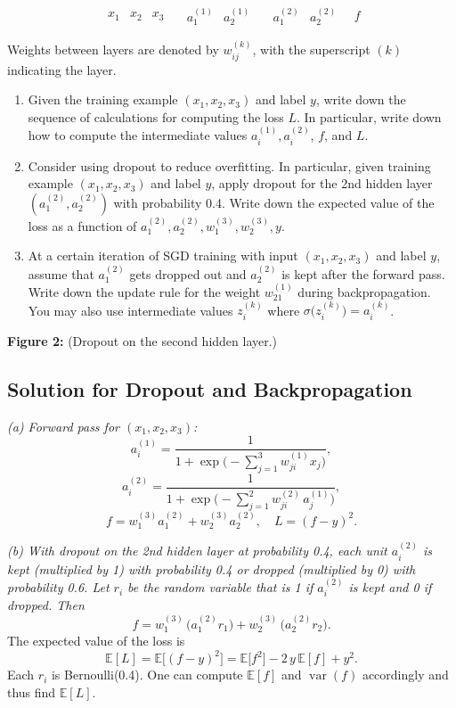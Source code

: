 \documentclass[twocolumn]{article}
\begin{document}
\begin{spacing}{1}
\[
\begin{array}{ccc}
x_1 & x_2 & x_3
\end{array}
\quad
\begin{array}{cc}
a_1^{(1)} & a_2^{(1)}
\end{array}
\quad
\begin{array}{cc}
a_1^{(2)} & a_2^{(2)}
\end{array}
\quad
f
\]

Weights between layers are denoted by $w_{ij}^{(k)}$, with the superscript $(k)$ indicating the layer.

\begin{enumerate}
\item Given the training example $(x_1,x_2,x_3)$ and label $y$, write down the sequence of calculations
for computing the loss $L$. In particular, write down how to compute the intermediate values 
$a_i^{(1)}, a_i^{(2)}$, $f$, and $L$.

\item Consider using dropout to reduce overfitting. In particular, given training example $(x_1,x_2,x_3)$
and label $y$, apply dropout for the 2nd hidden layer $(a_1^{(2)}, a_2^{(2)})$ with probability 0.4. 
Write down the expected value of the loss as a function of $a_1^{(2)}, a_2^{(2)}, w_1^{(3)}, w_2^{(3)}, y$.

\item At a certain iteration of SGD training with input $(x_1,x_2,x_3)$ and label $y$, assume that 
$a_1^{(2)}$ gets dropped out and $a_2^{(2)}$ is kept after the forward pass. Write down the update rule
for the weight $w_{21}^{(1)}$ during backpropagation. You may also use intermediate values 
$z_i^{(k)}$ where $\sigma\bigl(z_i^{(k)}\bigr) = a_i^{(k)}$.
\end{enumerate}

\bigskip
\noindent
\textbf{Figure 2:} (Dropout on the second hidden layer.)

\subsection*{Solution for Dropout and Backpropagation}

\noindent
\emph{(a) Forward pass for $(x_1,x_2,x_3)$:}
\[
a_i^{(1)} = \frac{1}{1+\exp\bigl(-\sum_{j=1}^3 w_{ji}^{(1)} x_j\bigr)}, 
\]
\[
a_i^{(2)} = \frac{1}{1+\exp\bigl(-\sum_{j=1}^2 w_{ji}^{(2)}\,a_j^{(1)}\bigr)},
\]
\[
f = w_{1}^{(3)} a_1^{(2)} + w_{2}^{(3)} a_2^{(2)},
\quad
L = (f - y)^2.
\]

\noindent
\emph{(b) With dropout on the 2nd hidden layer at probability 0.4, each unit $a_i^{(2)}$ is kept (multiplied by 1)
with probability 0.4 or dropped (multiplied by 0) with probability 0.6. Let $r_i$ be the random variable 
that is 1 if $a_i^{(2)}$ is kept and 0 if dropped. Then}
\[
f = w_{1}^{(3)}\,\bigl(a_1^{(2)} r_1\bigr) + w_{2}^{(3)}\,\bigl(a_2^{(2)} r_2\bigr).
\]
The expected value of the loss is
\[
\mathbb{E}[L] = \mathbb{E}\bigl[(f - y)^2\bigr] = \mathbb{E}\bigl[f^2\bigr] - 2\,y\,\mathbb{E}[f] + y^2.
\]
Each $r_i$ is Bernoulli(0.4). One can compute $\mathbb{E}[f]$ and $\operatorname{var}(f)$ accordingly and
thus find $\mathbb{E}[L]$.


\end{spacing}
\end{document}
